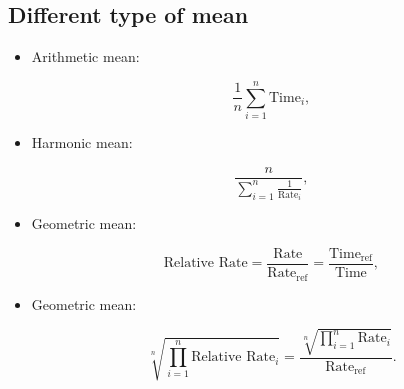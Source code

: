 \subsection{Different type of mean}
    \begin{itemize}[left=10pt, label=\textbullet]
        \item {Arithmetic mean}:
        \begin{tcolorbox}[gris]
            \[\frac{1}{n}\sum_{ i=1 } ^{ n }\text{Time}_i,\]
        \end{tcolorbox}
        \item {Harmonic mean}:
            \begin{tcolorbox}[gris]
                \[\frac{n}{\sum_{ i=1 } ^{ n }\frac{1}{\text{Rate}_i}},\]
            \end{tcolorbox}
        \item {Geometric mean}:
            \begin{tcolorbox}[gris]
                \[\text{Relative Rate}=\frac{\text{Rate}}{\text{Rate}_{\text{ref}}}=\frac{\text{Time}_{\text{ref}}}{\text{Time}},\]
            \end{tcolorbox}
        \item {Geometric mean}:
            \begin{tcolorbox}[gris]
                \[\sqrt[n]{\prod_{i=1}^{ n } \text{Relative Rate}_i}=\frac{\sqrt[n]{\prod_{i=1}^{ n } \text{Rate}_i}}{\text{Rate}_{\text{ref}}}.\]
            \end{tcolorbox}
            
                
            
            
    \end{itemize}
